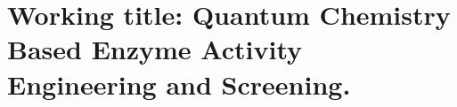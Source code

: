 \chapter[Working title: Quantum Chemistry Based Enzyme Activity Engineering and Screening.]
{Working title: Quantum Chemistry Based Enzyme Activity Engineering and Screening.\label{ch1}}


